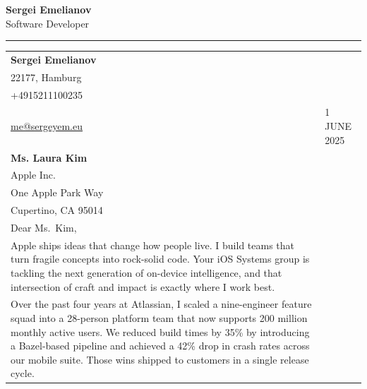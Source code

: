 \documentclass[11pt, a4paper]{article}
\begin{document}
	
	\noindent
	\begin{minipage}{\textwidth}
		\centering
		\vspace{1.2cm}
		{\fontsize{26}{30}\selectfont\bfseries Sergei Emelianov}\\[4pt]
		{\large\color{accentblue}Software Developer}
		\vspace{1.0cm}
	\end{minipage}
	
	\noindent\rule{\textwidth}{1.5pt}
	
	\vspace{0.6cm}
	
	\noindent
	\begin{tabularx}{\textwidth}{@{\hspace{2cm}} p{4.5cm} @{\hspace{0.5cm}} X @{\hspace{2cm}}}
		
		\raggedright
		{\bfseries Sergei Emelianov}\\[2pt]
		22177, Hamburg\\[2pt]
		{\color{accentblue}+4915211100235}\\[2pt]
		{\color{accentblue}\href{mailto:me@sergeyem.eu}{me@sergeyem.eu}}
		
		&
		
		\raggedright
		1 JUNE 2025\\[10pt]
		{\bfseries Ms. Laura Kim}\\[1pt]
		Apple Inc.\\[1pt]
		One Apple Park Way\\[1pt]
		Cupertino, CA 95014\\[18pt]
		
		Dear Ms.\ Kim,\\[10pt]
		
		Apple ships ideas that change how people live. I build teams that turn fragile concepts into rock-solid code. Your iOS Systems group is tackling the next generation of on-device intelligence, and that intersection of craft and impact is exactly where I work best.\\[10pt]
		
		Over the past four years at Atlassian, I scaled a nine-engineer feature squad into a 28-person platform team that now supports 200 million monthly active users. We reduced build times by 35\% by introducing a Bazel-based pipeline and achieved a 42\% drop in crash rates across our mobile suite. Those wins shipped to customers in a single release cycle.\\[10pt]
		

\end{tabularx}
\end{document}
